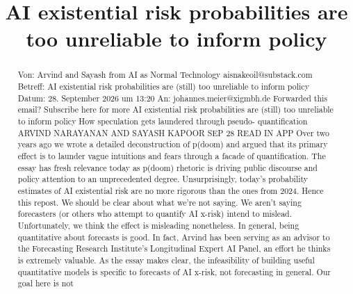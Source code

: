 \title{AI existential risk probabilities are too unreliable to inform policy}

\maketitle

\begin{abstract}
Von: Arvind and Sayash from AI as Normal Technology aisnakeoil@substack.com Betreff: AI existential risk probabilities are (still) too unreliable to inform policy Datum: 28. September 2026 um 13:20 An: johannes.meier@xigmbh.de Forwarded this email? Subscribe here for more AI existential risk probabilities are (still) too unreliable to inform policy How speculation gets laundered through pseudo- quantification ARVIND NARAYANAN AND SAYASH KAPOOR SEP 28 READ IN APP Over two years ago we wrote a detailed deconstruction of p(doom) and argued that its primary effect is to launder vague intuitions and fears through a facade of quantiﬁcation. The essay has fresh relevance today as p(doom) rhetoric is driving public discourse and policy attention to an unprecedented degree. Unsurprisingly, today’s probability estimates of AI existential risk are no more rigorous than the ones from 2024. Hence this repost. We should be clear about what we’re not saying. We aren’t saying forecasters (or others who attempt to quantify AI x-risk) intend to mislead. Unfortunately, we think the effect is misleading nonetheless. In general, being quantitative about forecasts is good. In fact, Arvind has been serving as an advisor to the Forecasting Research Institute’s Longitudinal Expert AI Panel, an effort he thinks is extremely valuable. As the essay makes clear, the infeasibility of building useful quantitative models is speciﬁc to forecasts of AI x-risk, not forecasting in general. Our goal here is not 
\end{abstract}


